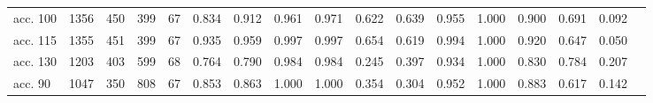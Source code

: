 \begin{tabular}{@{}l rrrr rrrr rr rr rrr r@{}}
acc. 100 & 1356 & 450 & 399 & 67 & 0.834 & 0.912 & 0.961 & 0.971 & 0.622 & 0.639 & 0.955 & 1.000 & 0.900 & 0.691 & 0.092 &  \\
acc. 115 & 1355 & 451 & 399 & 67 & 0.935 & 0.959 & 0.997 & 0.997 & 0.654 & 0.619 & 0.994 & 1.000 & 0.920 & 0.647 & 0.050 &  \\
acc. 130 & 1203 & 403 & 599 & 68 & 0.764 & 0.790 & 0.984 & 0.984 & 0.245 & 0.397 & 0.934 & 1.000 & 0.830 & 0.784 & 0.207 &  \\
acc. 90 & 1047 & 350 & 808 & 67 & 0.853 & 0.863 & 1.000 & 1.000 & 0.354 & 0.304 & 0.952 & 1.000 & 0.883 & 0.617 & 0.142 &  \\
\bottomrule
\end{tabular}
